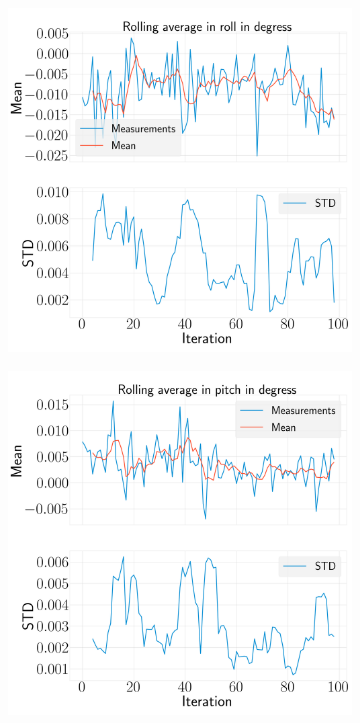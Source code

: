 \documentclass[../Head/report.tex]{subfiles}
\begin{document}
\begin{figure}[H]
    \centering
    \begin{subfigure}[t]{.30\textwidth}
        \centering
        \includegraphics[width=\textwidth]{../Figures/analyse_rolling_average/test1/Calculated_rolling_average_in_roll_with_mean_and_STD.png}
        \caption{}
        \label{fig:rolling_average_in_roll_test1}
    \end{subfigure}
     \hspace{0.2em}
    \begin{subfigure}[t]{.30\textwidth}
        \centering
        \includegraphics[width=\textwidth]{../Figures/analyse_rolling_average/test1/Calculated_rolling_average_in_pitch_with_mean_and_STD.png}

\end{subfigure}
\end{figure}
\end{document}
